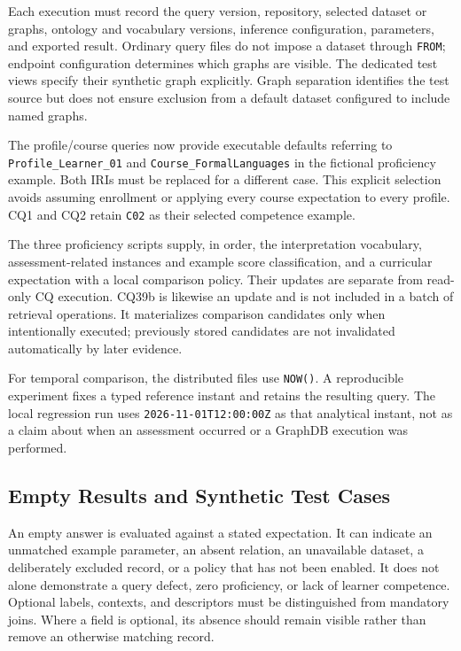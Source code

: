 Each execution must record the query version, repository, selected
dataset or graphs, ontology and vocabulary versions, inference
configuration, parameters, and exported result. Ordinary query files
do not impose a dataset through \texttt{FROM}; endpoint configuration
determines which graphs are visible. The dedicated test views specify
their synthetic graph explicitly. Graph separation identifies the test
source but does not ensure exclusion from a default dataset configured
to include named graphs.

The profile/course queries now provide executable defaults referring
to \texttt{Profile\_Learner\_01} and \texttt{Course\_FormalLanguages}
in the fictional proficiency example. Both IRIs must be replaced for
a different case. This explicit selection avoids assuming enrollment
or applying every course expectation to every profile. CQ1 and CQ2
retain \texttt{C02} as their selected competence example.

The three proficiency scripts supply, in order, the interpretation
vocabulary, assessment-related instances and example score
classification, and a curricular expectation with a local comparison
policy. Their updates are separate from read-only CQ execution.
CQ39b is likewise an update and is not included in a batch of
retrieval operations. It materializes comparison candidates only when
intentionally executed; previously stored candidates are not
invalidated automatically by later evidence.

For temporal comparison, the distributed files use \texttt{NOW()}.
A reproducible experiment fixes a typed reference instant and retains
the resulting query. The local regression run uses
\texttt{2026-11-01T12:00:00Z} as that analytical instant, not as a claim
about when an assessment occurred or a GraphDB execution was performed.

\subsection{Empty Results and Synthetic Test Cases}

An empty answer is evaluated against a stated expectation. It can
indicate an unmatched example parameter, an absent relation, an
unavailable dataset, a deliberately excluded record, or a policy that
has not been enabled. It does not alone demonstrate a query defect,
zero proficiency, or lack of learner competence. Optional labels,
contexts, and descriptors must be distinguished from mandatory joins.
Where a field is optional, its absence should remain visible rather
than remove an otherwise matching record.

